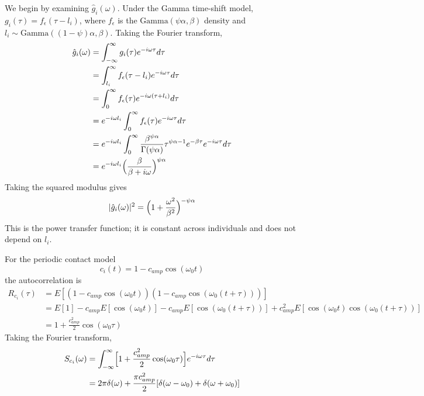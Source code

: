  We begin by examining $\hat{g}_i(\omega)$. Under the Gamma time-shift model, $g_i(\tau) = f_\epsilon(\tau - l_i)$, where $f_\epsilon$ is the $\text{Gamma}(\psi \alpha, \beta)$ density and $l_i \sim \text{Gamma}((1-\psi) \alpha, \beta)$. Taking the Fourier transform, 
\begin{align}
	\hat{g}_i(\omega) &= \int_{-\infty}^{\infty} g_i(\tau) e^{-i \omega \tau} d\tau \\ 
	&=	\int_{l_i}^{\infty} f_\epsilon(\tau - l_i) e^{-i \omega \tau}  d\tau\\ 
	&= \int_0^\infty f_\epsilon(\tau) e^{-i \omega (\tau + l_i)} d\tau \\
	&=  e^{-i \omega l_i} \int_0^\infty f_\epsilon(\tau) e^{-i \omega \tau} d\tau \\ 
	&= e^{-i \omega l_i} \int_0^\infty \frac{\beta^{\psi \alpha}}{\Gamma(\psi \alpha)} \tau^{\psi \alpha - 1} e^{-\beta \tau} e^{-i\omega\tau} d\tau \\
&= e^{-i \omega l_i} \Bigl(  \frac{\beta}{\beta + i \omega}\Bigr)^{\psi \alpha}
\end{align}
Taking the squared modulus gives 
\begin{equation}
 |\hat{g}_i(\omega)|^2 = \Bigl(1 + \frac{\omega^2}{\beta^2}\Bigr)^{-\psi \alpha}
\end{equation}
This is the power transfer function; it is constant across individuals and does not depend on $l_i$. 

 For the periodic contact model
\begin{equation}
c_i(t) = 1 - c_{amp} \cos(\omega_0 t)
\end{equation}
the autocorrelation is 
\begin{align}
R_{c_i}(\tau)  &= E[(1 - c_{amp} \cos(\omega_0 t)) (1 - c_{amp} \cos(\omega_0 (t + \tau)))] \\ 
&= E[1] - c_{amp}E[\cos(\omega_0 t)] - c_{amp}E[\cos(\omega_0 (t + \tau))] + c_{amp}^2 E[\cos(\omega_0 t) \cos(\omega_0 (t + \tau))] \\ 
&= 1 + \frac{c_{amp}^2}{2} \cos(\omega_0 \tau) 
\end{align}
Taking the Fourier transform, 
\begin{align}
	S_{c_i}(\omega) &= \int_{-\infty}^{\infty} \Bigl[ 1 + \frac{c_{amp}^2}{2} \cos(\omega_0\tau) \Bigr] e^{-i\omega\tau}d\tau \\ 
	&= 2 \pi \delta(\omega) + \frac{\pi c_{amp}^2}{2}[\delta(\omega - \omega_0) + \delta(\omega + \omega_0)] 
\end{align}

